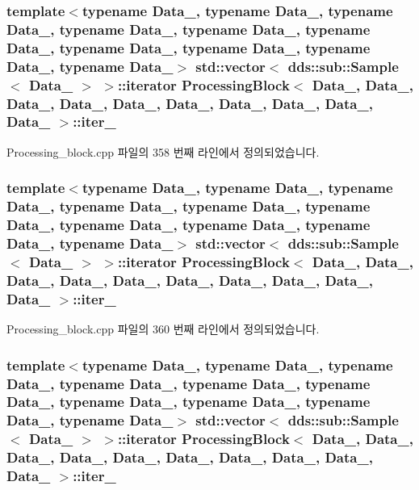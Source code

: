 \subsubsection[{\texorpdfstring{iter\+\_\+3}{iter_3}}]{\setlength{\rightskip}{0pt plus 5cm}template$<$typename Data\+\_, typename Data\+\_, typename Data\+\_, typename Data\+\_, typename Data\+\_, typename Data\+\_, typename Data\+\_, typename Data\+\_, typename Data\+\_, typename Data\+\_$>$ std\+::vector$<$ dds\+::sub\+::\+Sample$<$ Data\+\_ $>$ $>$\+::iterator {\bf Processing\+Block}$<$ Data\+\_, Data\+\_, Data\+\_, Data\+\_, Data\+\_, Data\+\_, Data\+\_, Data\+\_, Data\+\_, Data\+\_ $>$\+::iter\+\_}\hypertarget{classProcessingBlock_abc7c99fdfa686a7c06f19097e464cf31}{}\label{classProcessingBlock_abc7c99fdfa686a7c06f19097e464cf31}


Processing\+\_\+block.\+cpp 파일의 358 번째 라인에서 정의되었습니다.

\subsubsection[{\texorpdfstring{iter\+\_\+4}{iter_4}}]{\setlength{\rightskip}{0pt plus 5cm}template$<$typename Data\+\_, typename Data\+\_, typename Data\+\_, typename Data\+\_, typename Data\+\_, typename Data\+\_, typename Data\+\_, typename Data\+\_, typename Data\+\_, typename Data\+\_$>$ std\+::vector$<$ dds\+::sub\+::\+Sample$<$ Data\+\_ $>$ $>$\+::iterator {\bf Processing\+Block}$<$ Data\+\_, Data\+\_, Data\+\_, Data\+\_, Data\+\_, Data\+\_, Data\+\_, Data\+\_, Data\+\_, Data\+\_ $>$\+::iter\+\_}\hypertarget{classProcessingBlock_abce6ed2b33607842fdcabab95b2426bb}{}\label{classProcessingBlock_abce6ed2b33607842fdcabab95b2426bb}


Processing\+\_\+block.\+cpp 파일의 360 번째 라인에서 정의되었습니다.

\subsubsection[{\texorpdfstring{iter\+\_\+5}{iter_5}}]{\setlength{\rightskip}{0pt plus 5cm}template$<$typename Data\+\_, typename Data\+\_, typename Data\+\_, typename Data\+\_, typename Data\+\_, typename Data\+\_, typename Data\+\_, typename Data\+\_, typename Data\+\_, typename Data\+\_$>$ std\+::vector$<$ dds\+::sub\+::\+Sample$<$ Data\+\_ $>$ $>$\+::iterator {\bf Processing\+Block}$<$ Data\+\_, Data\+\_, Data\+\_, Data\+\_, Data\+\_, Data\+\_, Data\+\_, Data\+\_, Data\+\_, Data\+\_ $>$\+::iter\+\_}\hypertarget{classProcessingBlock_a6d4b5058373e350d7b7329010fe55f40}{}\label{classProcessingBlock_a6d4b5058373e350d7b7329010fe55f40}


